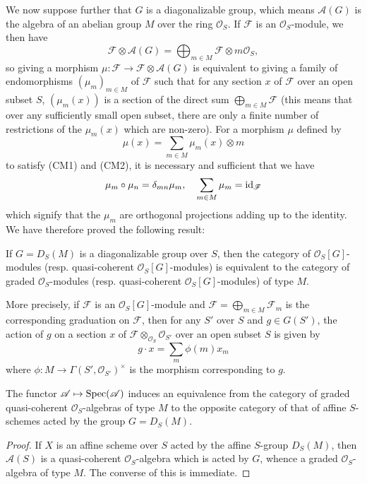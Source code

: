 We now suppose further that $G$ is a diagonalizable group, which means $\mathscr{A}(G)$ is the algebra of an abelian group $M$ over the ring $\mathscr{O}_S$. If $\mathscr{F}$ is an $\mathscr{O}_S$-module, we then have
\[\mathscr{F}\otimes\mathscr{A}(G)=\bigoplus_{m\in M}\mathscr{F}\otimes m\mathscr{O}_S,\]
so giving a morphism $\mu:\mathscr{F}\to\mathscr{F}\otimes\mathscr{A}(G)$ is equivalent to giving a family of endomorphisms $(\mu_m)_{m\in M}$ of $\mathscr{F}$ such that for any section $x$ of $\mathscr{F}$ over an open subset $S$, $(\mu_m(x))$ is a section of the direct sum $\bigoplus_{m\in M}\mathscr{F}$ (this means that over any sufficiently small open subset, there are only a finite number of restrictions of the $\mu_m(x)$ which are non-zero). For a morphism $\mu$ defined by
\[\mu(x)=\sum_{m\in M}\mu_m(x)\otimes m\]
to satisfy (CM1) and (CM2), it is necessary and sufficient that we have 
\[\mu_m\circ\mu_n=\delta_{mn}\mu_m,\quad \sum_{m\in M}\mu_m=\operatorname{id}_\mathscr{F}\]
which signify that the $\mu_m$ are orthogonal projections adding up to the identity. We have therefore proved the following result:
\begin{proposition}\label{scheme module over diagonalizable group cat equivalent to graded module}
If $G=D_S(M)$ is a diagonalizable group over $S$, then the category of $\mathscr{O}_S[G]$-modules (resp. quasi-coherent $\mathscr{O}_S[G]$-modules) is equivalent to the category of graded $\mathscr{O}_S$-modules (resp. quasi-coherent $\mathscr{O}_S[G]$-modules) of type $M$.
\end{proposition}

More precisely, if $\mathscr{F}$ is an $\mathscr{O}_S[G]$-module and $\mathscr{F}=\bigoplus_{m\in M}\mathscr{F}_m$ is the corresponding graduation on $\mathscr{F}$, then for any $S'$ over $S$ and $g\in G(S')$, the action of $g$ on a section $x$ of $\mathscr{F}\otimes_{\mathscr{O}_S}\mathscr{O}_{S'}$ over an open subset $S$ is given by
\[g\cdot x=\sum_m\phi(m)x_m\]
where $\phi:M\to\Gamma(S',\mathscr{O}_{S'})^\times$ is the morphism corresponding to $g$.

\begin{corollary}\label{scheme affine acted by diagonalizable group equivalent to graded alg}
The functor $\mathscr{A}\mapsto\mathrm{Spec}(\mathscr{A})$ induces an equivalence from the category of graded quasi-coherent $\mathscr{O}_S$-algebras of type $M$ to the opposite category of that of affine $S$-schemes acted by the group $G=D_S(M)$.
\end{corollary}
\begin{proof}
If $X$ is an affine scheme over $S$ acted by the affine $S$-group $D_S(M)$, then $\mathscr{A}(S)$ is a quasi-coherent $\mathscr{O}_S$-algebra which is acted by $G$, whence a graded $\mathscr{O}_S$-algebra of type $M$. The converse of this is immediate.
\end{proof}

